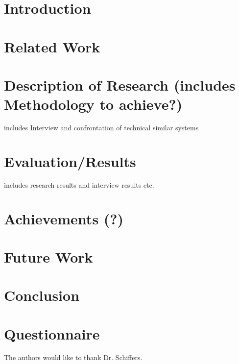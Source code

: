 
\section{Introduction}


\section{Related Work}



\section{Description of Research (includes Methodology to achieve?)}

includes Interview and confrontation of technical similar systems


\section{Evaluation/Results}

includes research results and interview results etc.


\section{Achievements (?)}



\section{Future Work}


\section{Conclusion}




\appendix
\section{Questionnaire}



\begin{acks}

The authors would like to thank Dr. Schiffers.



\end{acks}


%
